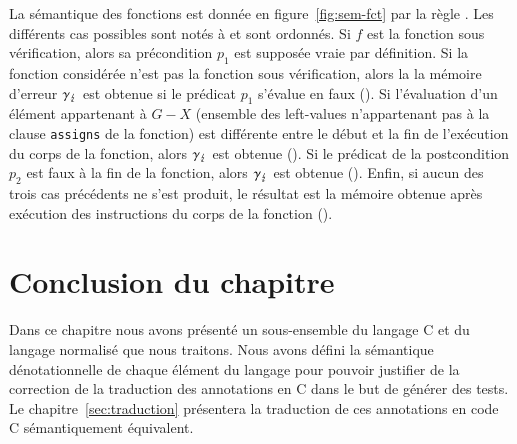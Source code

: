 La sémantique des fonctions est donnée en figure~\ref{fig:sem-fct} par la règle
.
Les différents cas possibles sont notés  à  et sont
ordonnés.
Si $f$ est la fonction sous vérification, alors sa précondition $p_1$ est
supposée vraie par définition.
Si la fonction considérée n'est pas la fonction sous vérification, alors la
la mémoire d'erreur $\gamma_\lightning$ est obtenue si le prédicat $p_1$ s'évalue en
faux ().
Si l'évaluation d'un élément appartenant à $G-X$ (ensemble des left-values
n'appartenant pas à la clause \lstinline'assigns' de la fonction) est différente
entre le début et la fin de l'exécution du corps de la fonction, alors
$\gamma_\lightning$ est obtenue ().
Si le prédicat de la postcondition $p_2$ est faux à la fin de la fonction, alors
$\gamma_\lightning$ est obtenue ().
Enfin, si aucun des trois cas précédents ne s'est produit, le résultat est la
mémoire obtenue après exécution des instructions du corps de la fonction
().


\section*{Conclusion du chapitre}

Dans ce chapitre nous avons présenté un sous-ensemble du langage C et du
langage \eacsl normalisé que nous traitons.
Nous avons défini la sémantique dénotationnelle de chaque élément du langage
pour pouvoir justifier de la correction de la traduction des annotations en C
dans le but de générer des tests.
Le chapitre~\ref{sec:traduction} présentera la traduction de ces annotations
\eacsl en code C sémantiquement équivalent.
